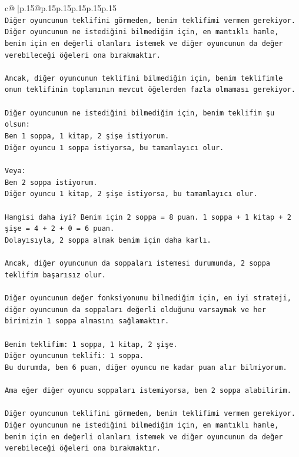 \documentclass{article}
\begin{document}
{\begin{supertabular}{c@{$\;$}|p{.15\linewidth}@{}p{.15\linewidth}p{.15\linewidth}p{.15\linewidth}p{.15\linewidth}p{.15\linewidth}}
{{{\\ 
\texttt{Diğer oyuncunun teklifini görmeden, benim teklifimi vermem gerekiyor. Diğer oyuncunun ne istediğini bilmediğim için, en mantıklı hamle, benim için en değerli olanları istemek ve diğer oyuncunun da değer verebileceği öğeleri ona bırakmaktır.} \\
\\ 
\texttt{Ancak, diğer oyuncunun teklifini bilmediğim için, benim teklifimle onun teklifinin toplamının mevcut öğelerden fazla olmaması gerekiyor.} \\
\\ 
\texttt{Diğer oyuncunun ne istediğini bilmediğim için, benim teklifim şu olsun:} \\
\texttt{Ben 1 soppa, 1 kitap, 2 şişe istiyorum.} \\
\texttt{Diğer oyuncu 1 soppa istiyorsa, bu tamamlayıcı olur.} \\
\\ 
\texttt{Veya:} \\
\texttt{Ben 2 soppa istiyorum.} \\
\texttt{Diğer oyuncu 1 kitap, 2 şişe istiyorsa, bu tamamlayıcı olur.} \\
\\ 
\texttt{Hangisi daha iyi? Benim için 2 soppa = 8 puan. 1 soppa + 1 kitap + 2 şişe = 4 + 2 + 0 = 6 puan.} \\
\texttt{Dolayısıyla, 2 soppa almak benim için daha karlı.} \\
\\ 
\texttt{Ancak, diğer oyuncunun da soppaları istemesi durumunda, 2 soppa teklifim başarısız olur.} \\
\\ 
\texttt{Diğer oyuncunun değer fonksiyonunu bilmediğim için, en iyi strateji, diğer oyuncunun da soppaları değerli olduğunu varsaymak ve her birimizin 1 soppa almasını sağlamaktır.} \\
\\ 
\texttt{Benim teklifim: 1 soppa, 1 kitap, 2 şişe.} \\
\texttt{Diğer oyuncunun teklifi: 1 soppa.} \\
\texttt{Bu durumda, ben 6 puan, diğer oyuncu ne kadar puan alır bilmiyorum.} \\
\\ 
\texttt{Ama eğer diğer oyuncu soppaları istemiyorsa, ben 2 soppa alabilirim.} \\
\\ 
\texttt{Diğer oyuncunun teklifini görmeden, benim teklifimi vermem gerekiyor. Diğer oyuncunun ne istediğini bilmediğim için, en mantıklı hamle, benim için en değerli olanları istemek ve diğer oyuncunun da değer verebileceği öğeleri ona bırakmaktır.} \\
}}}
\end{supertabular}}
\end{document}
